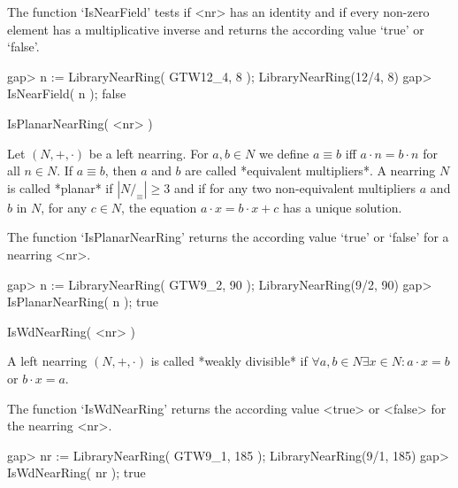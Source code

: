 The function `IsNearField' tests if <nr> has an identity and 
if every non-zero element has a multiplicative inverse and returns
the according value `true' or `false'.

\beginexample
     gap> n := LibraryNearRing( GTW12_4, 8 );
     LibraryNearRing(12/4, 8)
     gap> IsNearField( n );                        
     false    
\endexample

\>IsPlanarNearRing( <nr> )

Let $(N,+,\cdot)$ be a left nearring. For $a,b \in N$ we define $a \equiv b$
iff $a\cdot n = b\cdot n$ for all $n\in N$. If $a \equiv b$, then $a$ and $b$
are called *equivalent multipliers*.
A nearring $N$ is called *planar* if $| N/_{\equiv} | \ge 3$ and if 
for any two non-equivalent multipliers $a$ and $b$ in $N$, for any $c\in N$, 
the equation $a\cdot x = b\cdot x + c$ has a unique solution.

The function `IsPlanarNearRing' returns the according value `true' or
`false' for a nearring <nr>.

\beginexample
     gap> n := LibraryNearRing( GTW9_2, 90 );
     LibraryNearRing(9/2, 90)
     gap> IsPlanarNearRing( n );     
     true
\endexample

\>IsWdNearRing( <nr> )

A left nearring $(N,+,\cdot)$ is called *weakly divisible* if 
$\forall a,b\in N \exists x\in N : a\cdot x=b$ or $b\cdot x=a$. 

The function `IsWdNearRing' returns the according value <true> or <false> 
for the nearring <nr>.

\beginexample
     gap> nr := LibraryNearRing( GTW9_1, 185 );
     LibraryNearRing(9/1, 185)
     gap> IsWdNearRing( nr );
     true
\endexample







